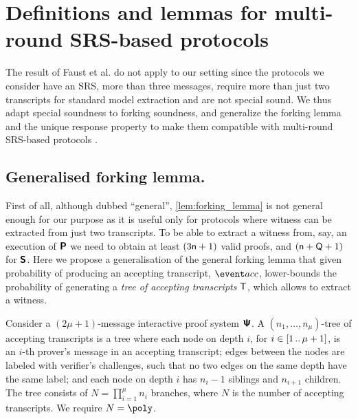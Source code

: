 \section{Definitions and lemmas for multi-round SRS-based protocols}
\label{sec:se_definitions}


The result of Faust et al.\cite{INDOCRYPT:FKMV12} do not apply to our setting
since the protocols we consider have an  SRS, more than three messages, require more than
just two transcripts for standard model extraction and are not special
sound. We thus adapt special
soundness to forking soundness, and generalize the forking lemma and the unique response property to make them compatible with
multi-round SRS-based protocols .


\subsection{Generalised forking lemma.}
First of all, although dubbed ``general'', \cref{lem:forking_lemma} is not
general enough for our purpose as it is useful only for protocols where witness
can be extracted from just two transcripts. To be able to extract a witness
from, say, an execution of $\bm{\mathsf{P}}$ we need to obtain at least
$(3 \mathsf{n} + 1)$ valid proofs, and $(\mathsf{n} + \mathsf{Q} + 1)$ for $\bm{\mathsf{S}}$. Here we
propose a generalisation of the general forking lemma that given probability of
producing an accepting transcript, $\accProb$, lower-bounds the probability of
generating a \emph{tree of accepting transcripts} $\mathsf{T}$, which allows to
extract a witness.

\begin{definition}
	\label{def:tree_of_accepting_transcripts}
	Consider a $(2\mu + 1)$-message interactive proof system $\bm{\mathsf{\Psi}}$. A $(n_1,
  \ldots, n_\mu)$-tree of accepting transcripts is a tree where each node on
  depth $i$, for $i \in [1 \, .. \, \mu + 1]$, is an $i$-th prover's message in an
  accepting transcript; edges between the nodes are labeled with verifier's
  challenges, such that no two edges on the same depth have the same
  label; and each node on depth $i$ has $n_{i} - 1$ siblings and $n_{i +
    1}$ children. The tree consists of $N = \prod_{i = 1}^\mu n_i$
  branches, where $N$ is the number of accepting transcripts. We require $N = \poly$.
\end{definition}


